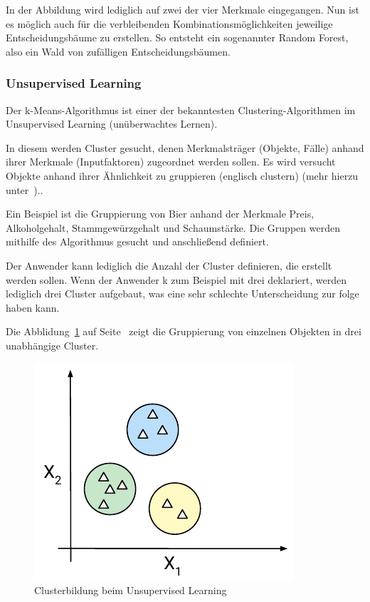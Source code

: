 In der Abbildung wird lediglich auf zwei der vier Merkmale eingegangen. Nun ist es möglich auch für die verbleibenden
Kombinationsmöglichkeiten jeweilige Entscheidungsbäume zu erstellen. So entsteht ein sogenannter Random Forest, also ein
Wald von zufälligen Entscheidungsbäumen.

\subsubsection{Unsupervised Learning}
Der k-Means-Algorithmus ist einer der bekanntesten Clustering-Algorithmen im Unsupervised Learning (unüberwachtes
Lernen).

In diesem werden Cluster gesucht, denen Merkmalsträger (Objekte, Fälle) anhand ihrer Merkmale (Inputfaktoren)
zugeordnet werden sollen. Es wird versucht Objekte anhand ihrer Ähnlichkeit zu gruppieren (englisch clustern) (mehr
hierzu unter~\cite{book_grundlagen_learnings})..

Ein Beispiel ist die Gruppierung von Bier anhand der Merkmale Preis, Alkoholgehalt, Stammgewürzgehalt und Schaumstärke.
Die Gruppen werden mithilfe des Algorithmus gesucht und anschließend definiert.

Der Anwender kann lediglich die Anzahl der Cluster definieren, die erstellt werden sollen. Wenn der Anwender k zum
Beispiel mit drei deklariert, werden lediglich drei Cluster aufgebaut, was eine sehr schlechte Unterscheidung zur folge
haben kann.

Die Abblidung~\ref{fig:grundlagen_unsupervised_learning} auf Seite~\pageref{fig:grundlagen_unsupervised_learning} zeigt
die Gruppierung von einzelnen Objekten in drei unabhängige Cluster.

\begin{figure}[h]
    \centering
    \includegraphics[scale=1.2]{images/kapitel_2/unsupervised_learning.pdf}
    \caption{Clusterbildung beim Unsupervised Learning}
    \label{fig:grundlagen_unsupervised_learning}
\end{figure}

